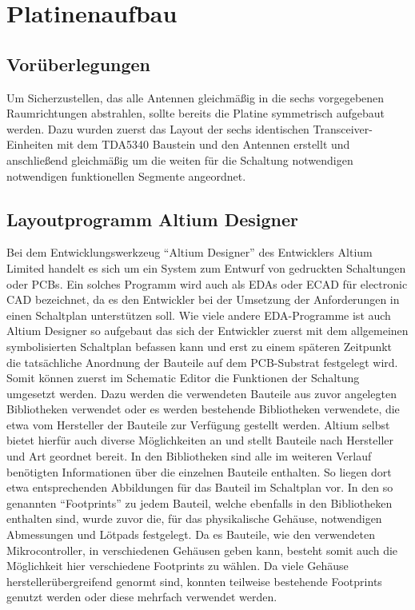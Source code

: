 \chapter{Platinenaufbau}
\label{sec:Platinenaufbau}
\pagestyle{scrheadings}

\section{Vorüberlegungen}
Um Sicherzustellen, das alle Antennen gleichmäßig in die sechs vorgegebenen Raumrichtungen abstrahlen, sollte bereits die Platine symmetrisch aufgebaut werden. Dazu wurden zuerst das Layout der sechs identischen Transceiver-Einheiten mit dem TDA5340 Baustein und den Antennen erstellt und anschließend gleichmäßig um die weiten für die Schaltung notwendigen notwendigen funktionellen Segmente angeordnet. 
\section{Layoutprogramm Altium Designer}
Bei dem Entwicklungswerkzeug \enquote{Altium Designer} des Entwicklers Altium Limited handelt es sich um ein System zum Entwurf von  gedruckten  Schaltungen oder \acp{PCB}. Ein solches Programm wird auch als \acp{EDA} oder ECAD für electronic \ac{CAD} bezeichnet, da es den Entwickler bei der Umsetzung der Anforderungen in einen Schaltplan unterstützen soll.
Wie viele andere \ac{EDA}-Programme ist auch Altium Designer so aufgebaut das sich der Entwickler zuerst mit dem allgemeinen symbolisierten Schaltplan befassen kann und erst zu einem späteren Zeitpunkt die tatsächliche Anordnung der Bauteile auf dem \ac{PCB}-Substrat festgelegt wird. Somit können zuerst im Schematic Editor die Funktionen der Schaltung umgesetzt werden. Dazu werden die verwendeten Bauteile aus zuvor angelegten Bibliotheken verwendet oder es werden bestehende Bibliotheken verwendete, die etwa vom Hersteller der Bauteile zur Verfügung gestellt werden. Altium selbst bietet hierfür auch diverse Möglichkeiten an und stellt Bauteile nach Hersteller und Art geordnet bereit.
In den Bibliotheken sind alle im weiteren Verlauf benötigten Informationen über die einzelnen Bauteile enthalten. So liegen dort etwa  entsprechenden Abbildungen für das Bauteil im  Schaltplan  vor. In den so genannten \enquote{Footprints} zu jedem Bauteil, welche ebenfalls in den Bibliotheken enthalten sind, wurde zuvor die, für das physikalische Gehäuse, notwendigen Abmessungen und Lötpads festgelegt. Da es Bauteile, wie den verwendeten  Mikrocontroller, in verschiedenen Gehäusen geben kann, besteht somit auch die Möglichkeit hier verschiedene Footprints zu wählen. Da viele Gehäuse herstellerübergreifend genormt sind, konnten teilweise bestehende Footprints genutzt werden oder diese mehrfach verwendet werden.

